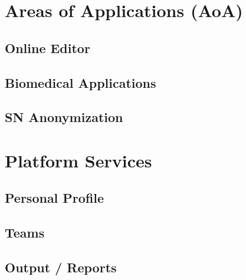 \section{Areas of Applications (AoA)}
\label{sect:areas_of_applications}

	\subsection{Online Editor}
	\label{ssect:aoa_editor}
	
	\subsection{Biomedical Applications}
	\label{ssect:aoa_bioapps}
	
	\subsection{SN Anonymization}
	\label{ssect:aoa_anonym}


\section{Platform Services}
\label{sect:platform_services}

	\subsection{Personal Profile}
	\label{ssect:service_profile}
	
	\subsection{Teams}
	\label{ssect:service_teams}
	
	\subsection{Output / Reports}
	\label{ssect:service_output}